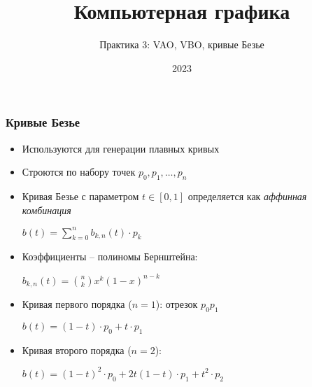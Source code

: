 \documentclass[10pt]{beamer}
\title{Компьютерная графика}
\subtitle{Практика 3: VAO, VBO, кривые Безье}
\date{2023}
\begin{document}
\frame{\titlepage}

\begin{frame}[fragile]
\frametitle{Кривые Безье}
\begin{itemize}
\item Используются для генерации плавных кривых
\pause
\item Строются по набору точек \begin{math}p_0, p_1, \dots, p_n\end{math}
\pause
\item Кривая Безье с параметром \begin{math}t \in [0, 1]\end{math} определяется как \textit{аффинная комбинация}

\begin{center}
\begin{math}
b(t) = \sum\limits_{k=0}^n b_{k,n}(t) \cdot p_k
\end{math}
\end{center}

\pause
\item Коэффициенты -- полиномы Бернштейна:

\begin{center}
\begin{math}
b_{k,n}(t) = \binom{n}{k}x^k(1-x)^{n-k}
\end{math}
\end{center}

\pause
\item Кривая первого порядка (\begin{math}n=1\end{math}): отрезок \begin{math}p_0 p_1\end{math}

\begin{center}
\begin{math}
b(t) = (1-t)\cdot p_0 + t \cdot p_1
\end{math}
\end{center}

\pause
\item Кривая второго порядка (\begin{math}n=2\end{math}):

\begin{center}
\begin{math}
b(t) = (1-t)^2 \cdot p_0 + 2t(1-t) \cdot p_1 + t^2 \cdot p_2
\end{math}
\end{center}

\end{itemize}
\end{frame}
\end{document}
